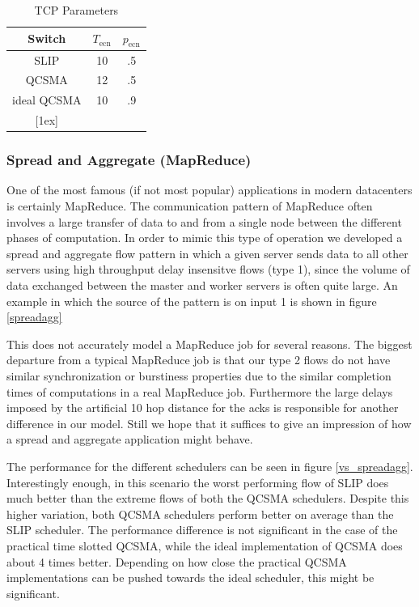 \documentclass{IEEEtran}%
\begin{document}
\begin{table}[ht] \caption{TCP Parameters} 
\centering 
\begin{tabular}{c c c}
 \hline\hline 
 Switch & $T_{\text{ecn}}$ & $p_{\text{ecn}}$ \\
  [0.5ex] \hline 
 SLIP&10&.5 \\
  QCSMA&12&.5  \\
   ideal  QCSMA&10&.9  \\
  [1ex] \hline 
  \end{tabular}
   \label{ecn_table} 
\end{table}


\subsubsection{Spread and Aggregate (MapReduce)}
One of the most famous (if not most popular) applications in modern datacenters is certainly MapReduce.  The communication pattern of MapReduce often involves a large transfer of data to and from a single node between the different phases of computation.  In order to mimic this type of operation we developed a spread and aggregate flow pattern in which a given server sends data to all other servers using high throughput delay insensitve flows (type 1), since the volume of data exchanged between the master and worker servers is often quite large.  An example in which the source of the pattern is on input 1 is shown in figure \ref{spreadagg}

This does not accurately model a MapReduce job for several reasons.  The biggest departure from a typical MapReduce job is that our type 2 flows do not have similar synchronization or burstiness properties due to the similar completion times of computations in a real MapReduce job.  Furthermore the large delays imposed by the artificial 10 hop distance for the acks is responsible for another difference in our model.  Still we hope that it suffices to give an impression of how a spread and aggregate application might behave.

The performance for the different schedulers can be seen in figure \ref{vs_spreadagg}.  Interestingly enough, in this scenario the worst performing flow of SLIP does much better than the extreme flows of both the QCSMA schedulers.  Despite this higher variation, both QCSMA schedulers perform better on average than the SLIP scheduler.  The performance difference is not significant in the case of the practical time slotted QCSMA, while the ideal implementation of QCSMA does about 4 times better.  Depending on how close the practical QCSMA implementations can be pushed towards the ideal scheduler, this might be significant.
\end{document}

